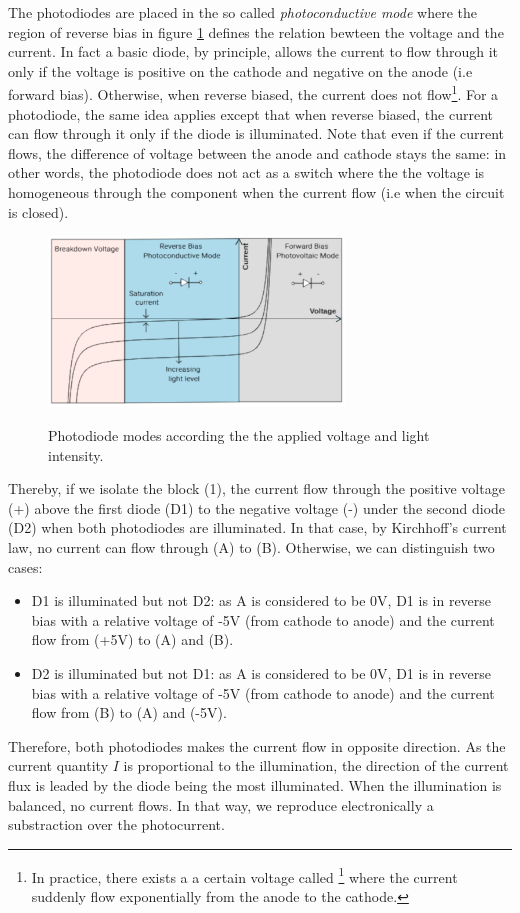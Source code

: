 \documentclass[12pt]{report}
\begin{document}
The photodiodes are placed in the so called \textit{photoconductive mode} where the region of reverse bias in figure \ref{fig:photodiode-vi} defines the relation bewteen the voltage and the current. In fact a basic diode, by principle, allows the current to flow through it only if the voltage is positive on the cathode and negative on the anode (i.e forward bias). Otherwise, when reverse biased, the current does not flow\footnote{In practice, there exists a a certain voltage called \footnote{breakdown voltage} where the current suddenly flow exponentially from the anode to the cathode.}. For a photodiode, the same idea applies except that when reverse biased, the current can flow through it only if the diode is illuminated. Note that even if the current flows, the difference of voltage between the anode and cathode stays the same: in other words, the photodiode does not act as a switch where the the voltage is homogeneous through the component when the current flow (i.e when the circuit is closed). 

\begin{figure}[h!]
\caption{Photodiode modes according the the applied voltage and light intensity.}
\centering
\includegraphics[width=0.7\textwidth]{photodiode-vi}
\label{fig:photodiode-vi}
\end{figure}

Thereby, if we isolate the block (1), the current flow through the positive voltage (+) above the first diode (D1) to the negative voltage (-) under the second diode (D2) when both photodiodes are illuminated. In that case, by Kirchhoff's current law, no current can flow through (A) to (B). Otherwise, we can distinguish two cases:
\begin{itemize}
 \item D1 is illuminated but not D2: as A is considered to be 0V, D1 is in reverse bias with a relative voltage of -5V (from cathode to anode) and the current flow from (+5V) to (A) and (B).
 \item D2 is illuminated but not D1: as A is considered to be 0V, D1 is in reverse bias with a relative voltage of -5V (from cathode to anode) and the current flow from (B) to (A) and (-5V).
\end{itemize}
Therefore, both photodiodes makes the current flow in opposite direction. As the current quantity $I$ is proportional to the illumination, the direction of the current flux is leaded by the diode being the most illuminated. When the illumination is balanced, no current flows. In that way, we reproduce electronically a substraction over the photocurrent.
\end{document}
